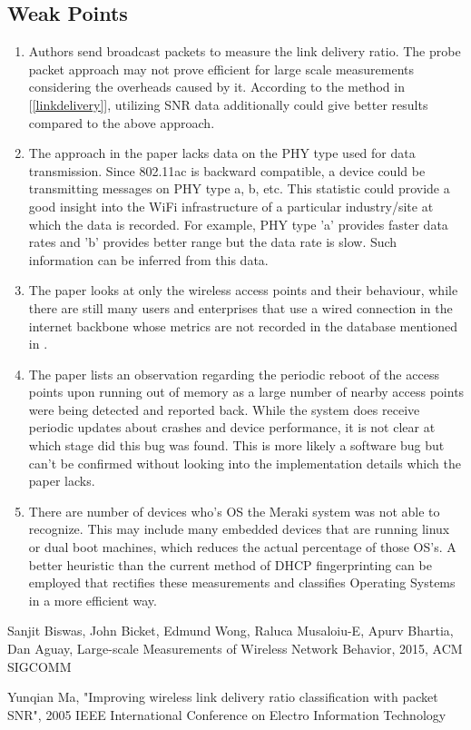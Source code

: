 \documentclass{article}
\begin{document}
\subsection{Weak Points}
\begin{enumerate}

    \item 
    Authors send broadcast packets to measure the link delivery ratio. The probe packet approach may not prove efficient for large scale measurements considering the overheads caused by it. According to the method in [\ref{linkdelivery}], utilizing SNR data additionally could give better results compared to the above approach.
    
    \item The approach in the paper lacks data on the PHY type used for data transmission. Since 802.11ac is backward compatible, a device could be transmitting messages on PHY type a, b, etc. This statistic could provide a good insight into the WiFi infrastructure of a particular industry/site at which the data is recorded. For example, PHY type 'a' provides faster data rates and 'b' provides better range but the data rate is slow. Such information can be inferred from this data. 

    \item The paper looks at only the wireless access points and their behaviour, while there are still many users and enterprises that use a wired connection in the internet backbone whose metrics are not recorded in the database mentioned in \cite{topic}.
    
    \item The paper lists an observation regarding the periodic reboot of the access points upon running out of memory as a large number of nearby access points were being detected and reported back. While the system does receive periodic updates about crashes and device performance, it is not clear at which stage did this bug was found. This is more likely a software bug but can't be confirmed without looking into the implementation details which the paper lacks.
    
    
    \item There are number of devices who's OS the Meraki system was not able to recognize. This may include many embedded devices that are running linux or dual boot machines, which reduces the actual percentage of those OS's. A better heuristic than the current method of DHCP fingerprinting can be employed that rectifies these measurements and classifies Operating Systems in a more efficient way.
\end{enumerate}




\begin{thebibliography}{9}
 \label{topic}
  Sanjit Biswas, John Bicket, Edmund Wong, Raluca Musaloiu-E, Apurv Bhartia, Dan Aguay, Large-scale Measurements of Wireless
Network Behavior, 2015, ACM SIGCOMM

 \label{linkdelivery}
  Yunqian Ma, "Improving wireless link delivery ratio classification with packet SNR", 2005 IEEE International Conference on Electro Information Technology

\end{thebibliography}
\end{document}
